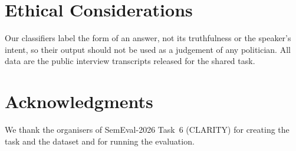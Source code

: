 \section*{Ethical Considerations}

Our classifiers label the form of an answer, not its truthfulness or the speaker's intent, so their output should not be used as a judgement of any politician.
All data are the public interview transcripts released for the shared task.

\section*{Acknowledgments}

We thank the organisers of SemEval-2026 Task~6 (CLARITY) for creating the task and the dataset and for running the evaluation.

